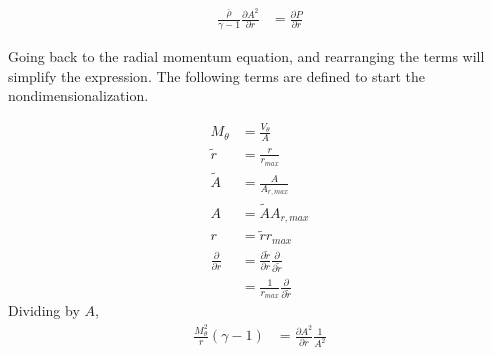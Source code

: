 \documentclass[12pt]{article}
\begin{document}
\begin{align*}
    \frac{\bar{\rho}}{\gamma -1}\frac{\partial A^2}{\partial r} &= \frac{\partial P}{\partial r} 
\end{align*}


Going back to the radial momentum equation, and rearranging the terms will simplify 
the expression. The following terms are defined to start the
nondimensionalization.  

\begin{align*}
    M_{\theta} &= \frac{V_{\theta}}{A} \\ 
    \widetilde{r} &= \frac{r}{r_{max}}  \\
    \widetilde{A} &= \frac{A}{A_{r,max}}  \\
    A &= \widetilde{A}{A_{r,max}} \\
    r &= \widetilde{r}{r_{max}}\\
    \frac{\partial}{\partial r} &=
    \frac{\partial \widetilde{r}}{\partial r} \frac{\partial}{\partial \widetilde{r}}\\
                                &= \frac{1}{r_{max}}\frac{\partial}{\partial \widetilde{r}}
\end{align*}
Dividing by $A$,
\begin{align*}
    \frac{M_{\theta}^2}{r}\left(\gamma - 1\right) 
 &= \frac{\partial A^2}{\partial r} \frac{1}{A^2}
\end{align*}
\end{document}
